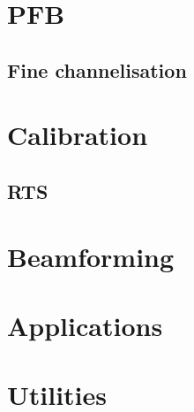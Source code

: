 \documentclass{book}
\begin{document}
\chapter{PFB}

\section{Fine channelisation}

\chapter{Calibration}

\section{RTS}

\chapter{Beamforming}

\chapter{Applications}

\chapter{Utilities}
\end{document}
